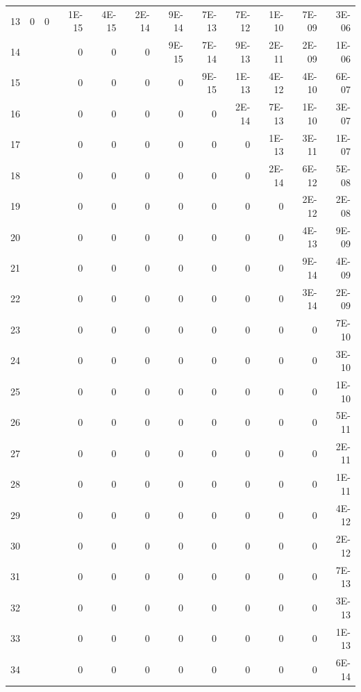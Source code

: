 \documentclass[11pt]{article}
\begin{document}
\begin{table}[htbp]
\begin{tabular}{rrrrrrrrrrrr}
    13    & 0     & 0     & 1E-15 & 4E-15 & 2E-14 & 9E-14 & 7E-13 & 7E-12 & 1E-10 & 7E-09 & 3E-06 \\
    14    &       &       & 0     & 0     & 0     & 9E-15 & 7E-14 & 9E-13 & 2E-11 & 2E-09 & 1E-06 \\
    15    &       &       & 0     & 0     & 0     & 0     & 9E-15 & 1E-13 & 4E-12 & 4E-10 & 6E-07 \\
    16    &       &       & 0     & 0     & 0     & 0     & 0     & 2E-14 & 7E-13 & 1E-10 & 3E-07 \\
    17    &       &       & 0     & 0     & 0     & 0     & 0     & 0     & 1E-13 & 3E-11 & 1E-07 \\
    18    &       &       & 0     & 0     & 0     & 0     & 0     & 0     & 2E-14 & 6E-12 & 5E-08 \\
    19    &       &       & 0     & 0     & 0     & 0     & 0     & 0     & 0     & 2E-12 & 2E-08 \\
    20    &       &       & 0     & 0     & 0     & 0     & 0     & 0     & 0     & 4E-13 & 9E-09 \\
    21    &       &       & 0     & 0     & 0     & 0     & 0     & 0     & 0     & 9E-14 & 4E-09 \\
    22    &       &       & 0     & 0     & 0     & 0     & 0     & 0     & 0     & 3E-14 & 2E-09 \\
    23    &       &       & 0     & 0     & 0     & 0     & 0     & 0     & 0     & 0     & 7E-10 \\
    24    &       &       & 0     & 0     & 0     & 0     & 0     & 0     & 0     & 0     & 3E-10 \\
    25    &       &       & 0     & 0     & 0     & 0     & 0     & 0     & 0     & 0     & 1E-10 \\
    26    &       &       & 0     & 0     & 0     & 0     & 0     & 0     & 0     & 0     & 5E-11 \\
    27    &       &       & 0     & 0     & 0     & 0     & 0     & 0     & 0     & 0     & 2E-11 \\
    28    &       &       & 0     & 0     & 0     & 0     & 0     & 0     & 0     & 0     & 1E-11 \\
    29    &       &       & 0     & 0     & 0     & 0     & 0     & 0     & 0     & 0     & 4E-12 \\
    30    &       &       & 0     & 0     & 0     & 0     & 0     & 0     & 0     & 0     & 2E-12 \\
    31    &       &       & 0     & 0     & 0     & 0     & 0     & 0     & 0     & 0     & 7E-13 \\
    32    &       &       & 0     & 0     & 0     & 0     & 0     & 0     & 0     & 0     & 3E-13 \\
    33    &       &       & 0     & 0     & 0     & 0     & 0     & 0     & 0     & 0     & 1E-13 \\
    34    &       &       & 0     & 0     & 0     & 0     & 0     & 0     & 0     & 0     & 6E-14 \\
    \bottomrule
    \end{tabular}%
  \label{tab:addlabel}%
\end{table}%
\end{document}
